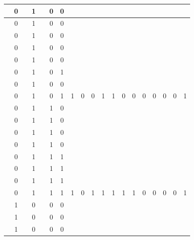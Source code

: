 \begin{table}[!tb]
\begin{tabular}{|c|c|c|c|c|c|c|c|c|c|c|c|c|c|c|c|c|c|c|}
        \rowcolor{red!40}  & 0 &  & 1 &  & 0 & 0 &  &  &  &  &  &  &  &  &  &  &  &  \\ \hline
        \rowcolor{red!40}  & 0 &  & 1 &  & 0 & 0 &  &  &  &  &  &  &  &  &  &  &  &  \\ \hline
        \rowcolor{red!40}  & 0 &  & 1 &  & 0 & 0 &  &  &  &  &  &  &  &  &  &  &  &  \\ \hline
        \rowcolor{red!40}  & 0 &  & 1 &  & 0 & 0 &  &  &  &  &  &  &  &  &  &  &  &  \\ \hline
        \rowcolor{red!40}  & 0 &  & 1 &  & 0 & 0 &  &  &  &  &  &  &  &  &  &  &  &  \\ \hline
        \rowcolor{red!40}  & 0 &  & 1 &  & 0 & 1 &  &  &  &  &  &  &  &  &  &  &  &  \\ \hline
        \rowcolor{red!40}  & 0 &  & 1 &  & 0 & 0 &  &  &  &  &  &  &  &  &  &  &  &  \\ \hline
        \rowcolor{red!40}  & 0 &  & 1 &  & 0 & 1 & 1 & 0 & 0 & 1 & 1 & 0 & 0 & 0 & 0 & 0 & 0 & 1 \\ \hline
        \rowcolor{green!40}  & 0 &  & 1 &  & 1 & 0 &  &  &  &  &  &  &  &  &  &  &  &  \\ \hline
        \rowcolor{green!40}  & 0 &  & 1 &  & 1 & 0 &  &  &  &  &  &  &  &  &  &  &  &  \\ \hline
        \rowcolor{green!40}  & 0 &  & 1 &  & 1 & 0 &  &  &  &  &  &  &  &  &  &  &  &  \\ \hline
        \rowcolor{green!40}  & 0 &  & 1 &  & 1 & 0 &  &  &  &  &  &  &  &  &  &  &  &  \\ \hline
        \rowcolor{green!40}  & 0 &  & 1 &  & 1 & 1 &  &  &  &  &  &  &  &  &  &  &  &  \\ \hline
        \rowcolor{green!40}  & 0 &  & 1 &  & 1 & 1 &  &  &  &  &  &  &  &  &  &  &  &  \\ \hline
        \rowcolor{green!40}  & 0 &  & 1 &  & 1 & 1 &  &  &  &  &  &  &  &  &  &  &  &  \\ \hline
        \rowcolor{green!40}  & 0 &  & 1 &  & 1 & 1 & 1 & 0 & 1 & 1 & 1 & 1 & 1 & 0 & 0 & 0 & 0 & 1 \\ \hline
        \rowcolor{yellow!40}  & 1 &  & 0 &  & 0 & 0 &  &  &  &  &  &  &  &  &  &  &  &  \\ \hline
        \rowcolor{yellow!40}  & 1 &  & 0 &  & 0 & 0 &  &  &  &  &  &  &  &  &  &  &  &  \\ \hline
        \rowcolor{yellow!40}  & 1 &  & 0 &  & 0 & 0 &  &  &  &  &  &  &  &  &  &  &  &  \\ \hline

\end{tabular}
\end{table}
